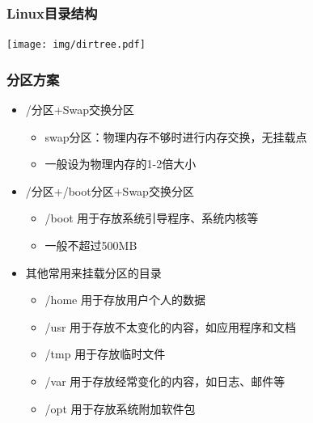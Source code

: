 \documentclass[xcolor=svgnames,bigger,presentation]{beamer}
\begin{document}
\begin{frame}
\frametitle{Linux目录结构}
\label{sec-3-2-2}

\texttt{[image: img/dirtree.pdf]}
\end{frame}
\begin{frame}
\frametitle{分区方案}
\label{sec-3-2-3}
\begin{itemize}

\item /分区+Swap交换分区
\label{sec-3-2-3-1}%
\begin{itemize}

\item swap分区：物理内存不够时进行内存交换，无挂载点
\label{sec-3-2-3-1-1}%

\item 一般设为物理内存的1-2倍大小
\label{sec-3-2-3-1-2}%
\end{itemize} %

\item /分区+/boot分区+Swap交换分区
\label{sec-3-2-3-2}%
\begin{itemize}

\item /boot 用于存放系统引导程序、系统内核等
\label{sec-3-2-3-2-1}%

\item 一般不超过500MB
\label{sec-3-2-3-2-2}%
\end{itemize} %

\item 其他常用来挂载分区的目录
\label{sec-3-2-3-3}%
\begin{itemize}

\item /home 用于存放用户个人的数据
\label{sec-3-2-3-3-1}%

\item /usr 用于存放不太变化的内容，如应用程序和文档
\label{sec-3-2-3-3-2}%

\item /tmp 用于存放临时文件
\label{sec-3-2-3-3-3}%

\item /var 用于存放经常变化的内容，如日志、邮件等
\label{sec-3-2-3-3-4}%

\item /opt 用于存放系统附加软件包
\label{sec-3-2-3-3-5}%
\end{itemize} %
\end{itemize} %
\end{frame}
\end{document}
